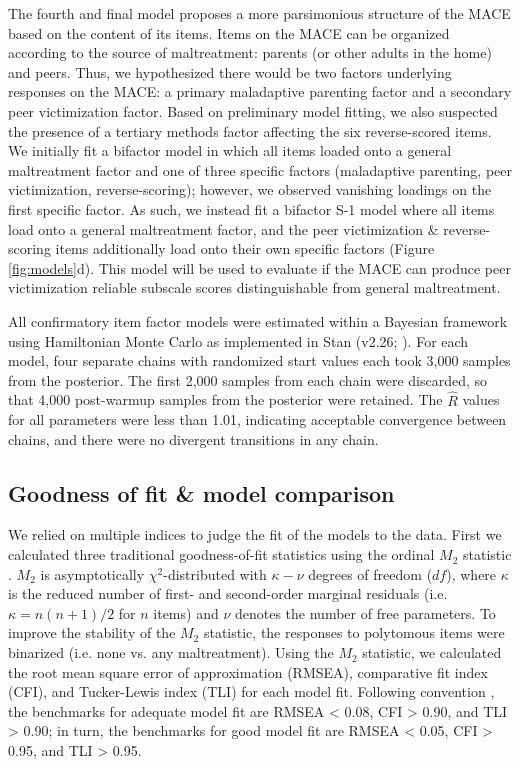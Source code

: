 \documentclass[letterpaper,man,natbib,floatsintext,longtable]{apa6}
\begin{document}
The fourth and final model proposes a more parsimonious structure of the MACE based on the content of its items. Items on the MACE can be organized according to the source of maltreatment: parents (or other adults in the home) and peers. Thus, we hypothesized there would be two factors underlying responses on the MACE: a primary maladaptive parenting factor and a secondary peer victimization factor. Based on preliminary model fitting, we also suspected the presence of a tertiary methods factor affecting the six reverse-scored items. We initially fit a bifactor model in which all items loaded onto a general maltreatment factor and one of three specific factors (maladaptive parenting, peer victimization, reverse-scoring); however, we observed vanishing loadings on the first specific factor. As such, we instead fit a bifactor S-1 model where all items load onto a general maltreatment factor, and the peer victimization \& reverse-scoring items additionally load onto their own specific factors (Figure \ref{fig:models}d). This model will be used to evaluate if the MACE can produce peer victimization reliable subscale scores distinguishable from general maltreatment. 

All confirmatory item factor models were estimated within a Bayesian framework using Hamiltonian Monte Carlo as implemented in Stan (v2.26; \citealt{carpenter2017stan}). For each model, four separate chains with randomized start values each took 3,000 samples from the posterior. The first 2,000 samples from each chain were discarded, so that 4,000 post-warmup samples from the posterior were retained. The $\hat{R}$ values for all parameters were less than 1.01, indicating acceptable convergence between chains, and there were no divergent transitions in any chain. 

\subsection{Goodness of fit \& model comparison}

We relied on multiple indices to judge the fit of the models to the data. First we calculated three traditional goodness-of-fit statistics using the ordinal $M_2$ statistic \citep{cai2013limited}. $M_2$ is asymptotically $\chi^2$-distributed with $\kappa − \nu$ degrees of freedom ($df$), where $\kappa$ is the reduced number of first- and second-order marginal residuals (i.e. $\kappa = n(n + 1)/2$ for $n$ items) and $\nu$ denotes the number of free parameters. To improve the stability of the $M_2$ statistic, the responses to polytomous items were binarized (i.e. none vs. any maltreatment). Using the $M_2$ statistic, we calculated the root mean square error of approximation (RMSEA), comparative fit index (CFI), and Tucker-Lewis index (TLI) for each model fit. Following convention \citep{hu1999cutoff}, the benchmarks for adequate model fit are RMSEA < 0.08, CFI > 0.90, and TLI > 0.90; in turn, the benchmarks for good model fit are RMSEA < 0.05, CFI > 0.95, and TLI > 0.95. 
\end{document}
